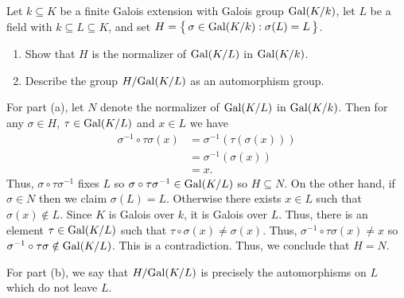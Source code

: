 \begin{problem}
  Let \(k\subseteq K\) be a finite Galois extension with Galois group
  \(\operatorname{Gal}(K/k)\), let \(L\) be a field with \(k\subseteq L\subseteq K\), and
  set \(H=\bigl\{\,\sigma\in\operatorname{Gal}(K/k):\sigma(L)=L\,\bigr\}\).
  \begin{enumerate}[label=(\alph*)]
  \item Show that \(H\) is the normalizer of \(\operatorname{Gal}(K/L)\) in
    \(\operatorname{Gal}(K/k)\).
  \item Describe the group \(H/{\operatorname{Gal}(K/L)}\) as an automorphism group.
  \end{enumerate}
\end{problem}
\begin{solution}
  For part (a), let \(N\) denote the normalizer of \(\operatorname{Gal}(K/L)\) in
  \(\operatorname{Gal}(K/k)\). Then for any \(\sigma\in H\), \(\tau\in\operatorname{Gal}(K/L)\) and
  \(x\in L\) we have
  \begin{align*}
    \sigma^{-1}\circ\tau\sigma(x)
    &=\sigma^{-1}(\tau(\sigma(x)))\\
    &=\sigma^{-1}(\sigma(x))\\
    &=x.
  \end{align*}
  Thus, \(\sigma\circ\tau\sigma^{-1}\) fixes \(L\) so
  \(\sigma\circ\tau\sigma^{-1}\in\operatorname{Gal}(K/L)\) so \(H\subseteq N\). On the
  other hand, if \(\sigma\in N\) then we claim \(\sigma(L)=L\). Otherwise
  there exists \(x\in L\) such that \(\sigma(x)\notin L\). Since \(K\) is
  Galois over \(k\), it is Galois over \(L\). Thus, there is an element
  \(\tau\in\operatorname{Gal}(K/L)\) such that \(\tau\circ\sigma(x)\neq\sigma(x)\). Thus,
  \(\sigma^{-1}\circ\tau\sigma(x)\neq x\) so
  \(\sigma^{-1}\circ\tau\sigma\notin\operatorname{Gal}(K/L)\). This is a
  contradiction. Thus, we conclude that \(H=N\).

  For part (b), we say that \(H/{\operatorname{Gal}(K/L)}\) is precisely the
  automorphisms on \(L\) which do not leave \(L\).
\end{solution}


